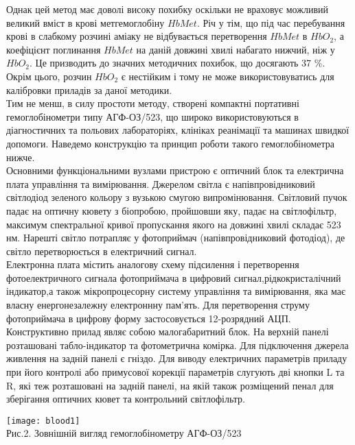 \documentclass[14pt,a4paper]{scrartcl}
\begin{document}
Однак цей метод має доволі високу похибку оскільки не враховує можливий великий вміст в крові метгемоглобіну $HbMet$. Річ у тім, що під час перебування крові в слабкому розчині аміаку не відбувається перетворення $HbMet$ в $HbO_2$, а коефіцієнт поглинання $HbMet$ на даній довжині хвилі набагато нижчий, ніж у $HbO_2$. Це призводить до значних методичних похибок, що досягають 37 \%. Окрім цього, розчин $HbO_2$ є нестійким і тому не може використовуватись для калібровки приладів за даної методики.\\

Тим не менш, в силу простоти методу, створені компактні портативні гемоглобінометри типу  АГФ-ОЗ/523, що широко використовуються в діагностичних та польових лабораторіях, клініках реанімації та машинах швидкої допомоги. Наведемо конструкцію та принцип роботи такого гемоглобінометра нижче.\\

Основними функціональними вузлами пристрою є оптичний блок та електрична плата управління та вимірювання. \cite{l3} Джерелом світла є напівпровідниковий світлодіод зеленого кольору з вузькою смугою випромінювання. Світловий пучок падає на оптичну кювету з біопробою, пройшовши яку, падає на світлофільтр, максимум спектральної кривої пропускання якого на довжині хвилі складає 523 нм. Нарешті світло потрапляє у фотоприймач (напівпровідниковий фотодіод), де світло перетворюється в електричний сигнал.\\

Електронна плата містить аналогову схему підсилення і перетворення фотоелектричного сигнала фотоприймача в цифровий сигнал,рідкокристалічний індикатор,а також мікропроцесорну систему управління та вимірювання, яка має власну енергонезалежну електроннну пам'ять. Для перетворення струму фотоприймача в цифрову форму застосовується 12-розрядний АЦП.\\

Конструктивно прилад являє собою малогабаритний блок. На верхній панелі розташовані табло-індикатор та фотометрична комірка. Для підключення джерела живлення на задній панелі є гніздо. Для виводу електричних параметрів приладу при його контролі або примусової корекції параметрів слугують дві кнопки L та R, які теж розташовані на задній панелі, на якій також розміщений пенал для зберігання оптичних кювет та контрольний світлофільтр.

\begin{center}
\small
\texttt{[image: blood1]}\\[0.3 cm]
Рис.2. Зовнішній вигляд гемоглобінометру  АГФ-ОЗ/523 \cite{l4}
\end{center}
\end{document}
